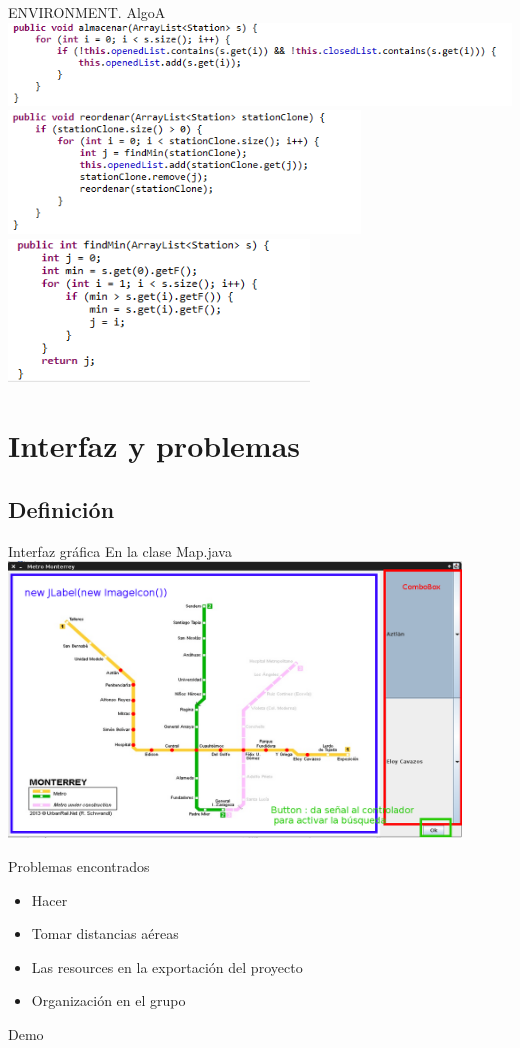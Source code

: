 \documentclass[11pt]{beamer}
\begin{document}
\begin{frame}{ENVIRONMENT. AlgoA}
\includegraphics[width=1\textwidth]{images/almacenar.png}
\\
\includegraphics[width=0.7\textwidth]{images/reordenar.png}
\\
\includegraphics[width=0.6\textwidth]{images/findmin.png}
\end{frame}

\section{Interfaz y problemas}
\subsection*{Definici\'on}
\begin{frame}{Interfaz gráfica}
En la clase Map.java\\
\includegraphics[width=0.9\textwidth]{images/interface.png}
\end{frame}

\begin{frame}{Problemas encontrados}
\begin{itemize}
\item Hacer
\item Tomar distancias aéreas
\item Las resources en la exportación del proyecto
\item Organización en el grupo
\end{itemize}
\end{frame}

\begin{frame}{Demo}
\end{frame}
\end{document}
